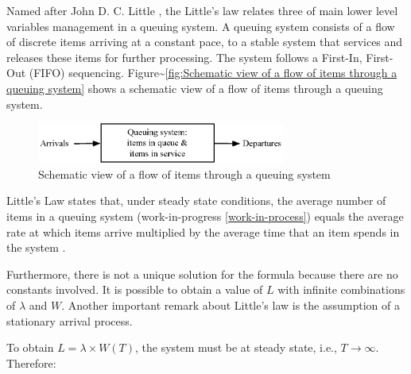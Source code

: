 \documentclass{article}
\begin{document}
Named after John D. C. Little \citep{Little1961}, the Little's law relates three of main lower level variables management in a queuing system.
A queuing system consists of a flow of discrete items arriving at a constant pace, to a stable system that services and releases these items for further processing.
The system follows a First-In, First-Out (FIFO) sequencing.
Figure\textasciitilde{}\ref{fig:Schematic view of a flow of items through a queuing system} shows a schematic view of a flow of items through a queuing system.

\begin{figure}[htbp]
\centering
\includegraphics[height=50]{Figures/Schematic_view_of_a_flow_of_items_through_a_queuing_system.eps}
\caption{\label{fig:org229e7eb}Schematic view of a flow of items through a queuing system}
\end{figure}


Little's Law states that, under steady state conditions, the average number of items in a queuing system (work-in-progress \ref{work-in-process}) equals the average rate at which items arrive multiplied by the average time that an item spends in the system \citep{Little2008}.

Furthermore, there is not a unique solution for the formula because there are no constants involved.
It is possible to obtain a value of \(L\) with infinite combinations of \(\lambda\) and \(W\).
Another important remark about Little's law is the assumption of a stationary arrival process.

To obtain \(L=\lambda \times W(T)\), the system must be at steady state, i.e., \(T \rightarrow \infty\).
Therefore:
\end{document}
